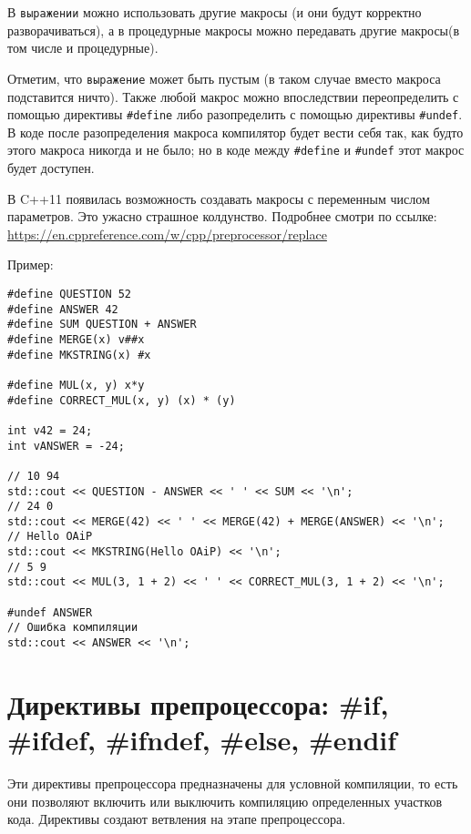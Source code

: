 В \verb|выражении| можно использовать другие макросы (и они будут корректно разворачиваться),
а в процедурные макросы можно передавать другие макросы(в том числе и процедурные).

Отметим, что \verb|выражение| может быть пустым (в таком случае
вместо макроса подставится ничто). Также любой макрос можно впоследствии переопределить
с помощью директивы \verb|#define| либо разопределить с помощью директивы \verb|#undef|.
В коде после разопределения макроса компилятор будет вести себя так, как будто этого
макроса никогда и не было; но в коде между \verb|#define| и \verb|#undef| этот макрос
будет доступен.

{\small В C++11 появилась возможность создавать макросы с переменным числом параметров.
Это ужасно страшное колдунство. Подробнее смотри по ссылке:
\url{https://en.cppreference.com/w/cpp/preprocessor/replace}}

Пример:
\begin{verbatim}
#define QUESTION 52
#define ANSWER 42
#define SUM QUESTION + ANSWER
#define MERGE(x) v##x
#define MKSTRING(x) #x

#define MUL(x, y) x*y
#define CORRECT_MUL(x, y) (x) * (y)

int v42 = 24;
int vANSWER = -24;

// 10 94
std::cout << QUESTION - ANSWER << ' ' << SUM << '\n';
// 24 0
std::cout << MERGE(42) << ' ' << MERGE(42) + MERGE(ANSWER) << '\n';
// Hello OAiP
std::cout << MKSTRING(Hello OAiP) << '\n';
// 5 9
std::cout << MUL(3, 1 + 2) << ' ' << CORRECT_MUL(3, 1 + 2) << '\n';

#undef ANSWER
// Ошибка компиляции
std::cout << ANSWER << '\n';
\end{verbatim}


\section{Директивы препроцессора: \#if, \#ifdef, \#ifndef, \#else, \#endif}
Эти директивы препроцессора предназначены для условной компиляции, то есть они позволяют
включить или выключить компиляцию определенных участков кода. Директивы создают ветвления
на этапе препроцессора.

